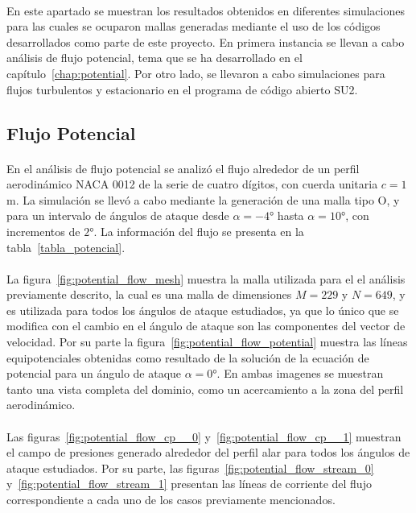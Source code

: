 \documentclass[letterpaper, openright, 12pt]{book}
\begin{document}
    \paragraph*{}
    En este apartado se muestran los resultados obtenidos en diferentes
    simulaciones para las cuales se ocuparon mallas generadas mediante el uso
    de los códigos desarrollados como parte de este proyecto. En primera
    instancia se llevan a cabo análisis de flujo potencial, tema que se ha
    desarrollado en el capítulo~\ref{chap:potential}. Por otro lado, se
    llevaron a cabo simulaciones para flujos turbulentos y estacionario en el
    programa de código abierto SU2.



    \subsection{Flujo Potencial}
    \paragraph*{}
    En el análisis de flujo potencial se analizó el flujo alrededor de un
    perfil aerodinámico NACA 0012 de la serie de cuatro dígitos, con cuerda
    unitaria $c = 1$ m. La simulación se llevó a cabo mediante la generación
    de una malla tipo O, y para un intervalo de ángulos de ataque desde
    $\alpha = -4\si{\degree}$ hasta $\alpha = 10\si{\degree}$, con incrementos
    de $2\si{\degree}$. La información del flujo se presenta en la
    tabla~\ref{tabla_potencial}.

    \paragraph*{}
    La figura~\ref{fig:potential_flow_mesh} muestra la malla utilizada para el
    el análisis previamente descrito, la cual es una malla de
    dimensiones $M = 229$ y $N = 649$, y es utilizada para todos los ángulos de
    ataque estudiados, ya que lo único que se modifica con el cambio en el
    ángulo de ataque son las componentes del vector de velocidad. Por su parte
    la figura~\ref{fig:potential_flow_potential} muestra las líneas
    equipotenciales obtenidas como resultado de la solución de la ecuación de
    potencial para un ángulo de ataque $\alpha = 0\si{\degree}$. En ambas
    imagenes se muestran tanto una vista completa del dominio, como un
    acercamiento a la zona del perfil aerodinámico.

    \paragraph*{}
    Las figuras~\ref{fig:potential_flow_cp__0} y~\ref{fig:potential_flow_cp__1}
    muestran el campo de presiones generado alrededor del perfil alar para
    todos los ángulos de ataque estudiados. Por su parte, las
    figuras~\ref{fig:potential_flow_stream_0}
    y~\ref{fig:potential_flow_stream_1} presentan las líneas de corriente del
    flujo correspondiente a cada uno de los casos previamente mencionados.
\end{document}
